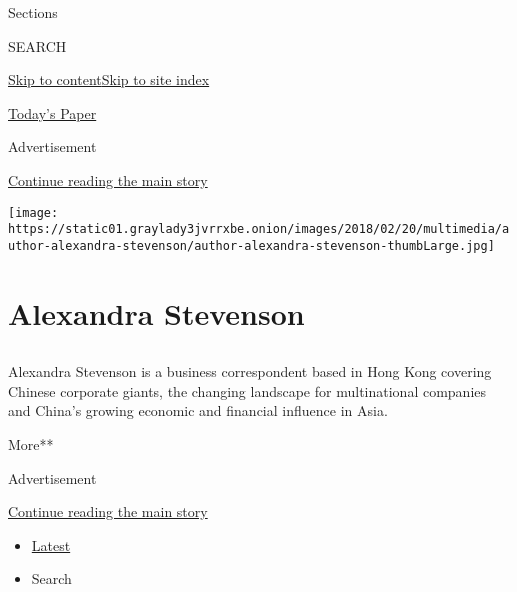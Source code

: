 Sections

SEARCH

\protect\hyperlink{site-content}{Skip to
content}\protect\hyperlink{site-index}{Skip to site index}

\href{https://myaccount.nytimes3xbfgragh.onion/auth/login?response_type=cookie\&client_id=vi}{}

\href{https://www.nytimes3xbfgragh.onion/section/todayspaper}{Today's
Paper}

Advertisement

\protect\hyperlink{after-top}{Continue reading the main story}

\texttt{[image: https://static01.graylady3jvrrxbe.onion/images/2018/02/20/multimedia/author-alexandra-stevenson/author-alexandra-stevenson-thumbLarge.jpg]}

\hypertarget{alexandra-stevenson}{%
\section{Alexandra Stevenson}\label{alexandra-stevenson}}

\subsection{}

Alexandra Stevenson is a business correspondent based in Hong Kong
covering Chinese corporate giants, the changing landscape for
multinational companies and China's growing economic and financial
influence in Asia.

More**

Advertisement

\protect\hyperlink{after-mid1}{Continue reading the main story}

\begin{itemize}
\tightlist
\item
  \protect\hyperlink{stream-panel}{Latest}
\item
  Search
\end{itemize}


